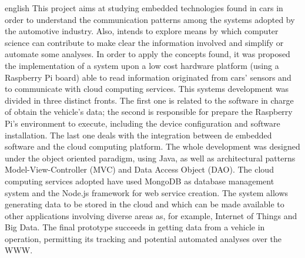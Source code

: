 \begin{resumo}[ABSTRACT]
 \begin{otherlanguage*}{english}
 \hspace{1.5cm}
   This project aims at studying embedded technologies found in cars in order to understand the communication patterns among the systems adopted by the automotive industry. Also, intends to explore means by which computer science can contribute to make clear the information involved and simplify or automate some analyses. In order to apply the concepts found, it was proposed the implementation of a system upon a low cost hardware platform (using a Raspberry Pi board) able to read information originated from cars’ sensors and to communicate with cloud computing services. This systems development was divided in three distinct fronts. The first one is related to the software in charge of obtain the vehicle's data; the second is responsible for prepare the Raspberry Pi's environment to execute, including the device configuration and software installation. The last one deals with the integration between de embedded software and the cloud computing platform. The whole development was designed under the object oriented paradigm, using Java, as well as architectural patterns Model-View-Controller (MVC) and Data Access Object (DAO). The cloud computing services adopted have used MongoDB as database management system and the Node.js framework for web service creation. The system allows generating data to be stored in the cloud and which can be made available to other applications involving diverse areas as, for example, Internet of Things and Big Data. The final prototype succeeds in getting data from a vehicle in operation, permitting its tracking and potential automated analyses over the WWW. 

 \end{otherlanguage*}
\end{resumo}